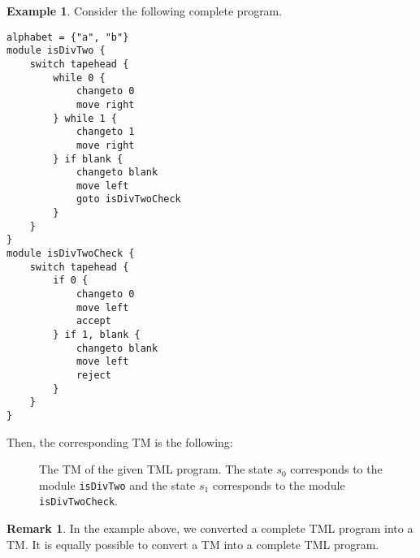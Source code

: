 \documentclass{article}
\theoremstyle{definition}
\newtheorem{remark}[theorem]{Remark}
\newtheorem{example}[theorem]{Example}
\begin{document}
    \begin{example}
        Consider the following complete program.
\begin{lstlisting}[language=TML]
alphabet = {"a", "b"}
module isDivTwo {
    switch tapehead {
        while 0 {
            changeto 0
            move right
        } while 1 {
            changeto 1
            move right
        } if blank {
            changeto blank
            move left
            goto isDivTwoCheck
        }
    }
}
module isDivTwoCheck {
    switch tapehead {
        if 0 {
            changeto 0
            move left
            accept
        } if 1, blank {
            changeto blank
            move left
            reject
        }
    }
}
\end{lstlisting}
    Then, the corresponding TM is the following:
    \begin{figure}[H]
        \centering
        \caption{The TM of the given TML program. The state $s_0$ corresponds to the module \texttt{isDivTwo} and the state $s_1$ corresponds to the module \texttt{isDivTwoCheck}.}
    \end{figure}
    \end{example}
    \begin{remark}
        In the example above, we converted a complete TML program into a TM. It is equally possible to convert a TM into a complete TML program.
    \end{remark}
\end{document}
